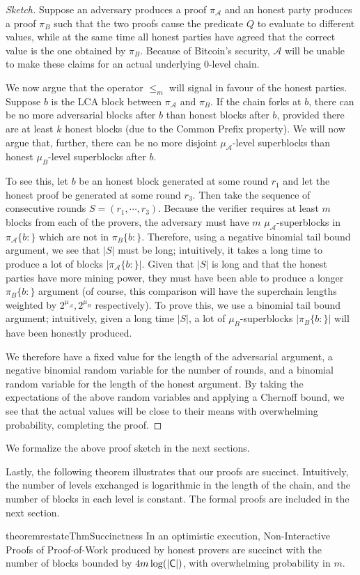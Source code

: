 \begin{proof}[Sketch]
Suppose an adversary produces a proof $\pi_\mathcal{A}$ and an honest
party produces a proof $\pi_B$ such that the two proofs cause the predicate $Q$
to evaluate to different values, while at the same time all honest parties have
agreed that the correct value is the one obtained by $\pi_B$. Because of
Bitcoin's security, $\mathcal{A}$ will be unable to make these claims for an
actual underlying 0-level chain.

We now argue that the operator $\leq_m$ will
signal in favour of the honest parties.
Suppose $b$ is the LCA block between $\pi_\mathcal{A}$ and $\pi_B$. If the chain
forks at $b$, there can be no more adversarial blocks after $b$ than honest
blocks after $b$, provided there are at least $k$ honest blocks (due to the
Common Prefix property). We will now argue that, further, there can be no more
disjoint $\mu_\mathcal{A}$-level superblocks than honest $\mu_B$-level
superblocks after $b$.

To see this, let $b$ be an honest block generated at some round $r_1$ and let
the honest proof be generated at some round $r_3$. Then take the sequence
of consecutive rounds $S = (r_1, \cdots, r_3)$. Because the verifier requires at
least $m$ blocks from each of the provers, the adversary must have $m$
$\mu_\mathcal{A}$-superblocks in $\pi_\mathcal{A}\{b:\}$ which are not in
$\pi_B\{b:\}$. Therefore, using a negative binomial tail bound argument, we see
that $|S|$ must be long; intuitively, it takes a long time to produce a lot of
blocks $|\pi_\mathcal{A}\{b:\}|$. Given that $|S|$ is long and that the honest
parties have more mining power, they must have been able to produce a longer
$\pi_B\{b:\}$ argument (of course, this comparison will have the superchain
lengths weighted by $2^{\mu_\mathcal{A}}, 2^{\mu_B}$ respectively). To prove
this, we use a binomial tail bound argument; intuitively, given a long time
$|S|$, a lot of $\mu_B$-superblocks $|\pi_B\{b:\}|$ will have been honestly
produced.

We therefore have a fixed value for the length of the adversarial argument, a
negative binomial random variable for the number of rounds, and a binomial
random variable for the length of the honest argument. By taking the
expectations of the above random variables and applying a Chernoff bound, we see
that the actual values will be close to their means with overwhelming
probability, completing the proof.
\end{proof}

We formalize the above proof sketch in the next sections.

Lastly, the following theorem illustrates that our proofs are succinct.
Intuitively, the number of levels exchanged is logarithmic in the length of the
chain, and the number of blocks in each level is constant. The formal proofs
are included in the next section.

\begin{restatable}{theorem}{restateThmSuccinctness}
    In an optimistic execution, Non-Interactive Proofs of Proof-of-Work produced
    by honest provers are succinct with the number of blocks bounded by $4m
    \log(|\mathsf{C}|)$, with overwhelming probability in $m$.
\end{restatable}
